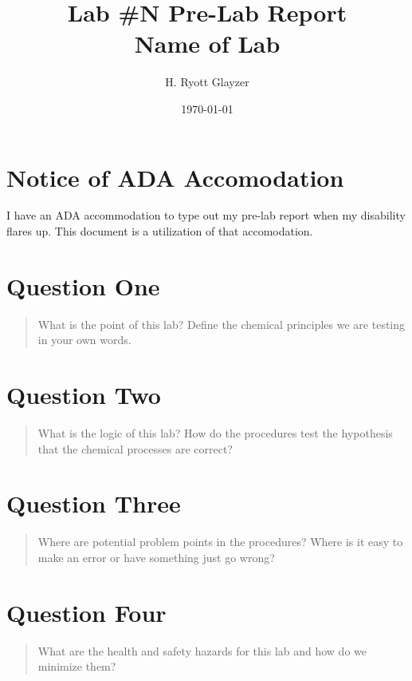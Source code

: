 \documentclass[11pt, letterpaper]{article}
\begin{document}


\title{Lab \#N Pre-Lab Report \\ \large Name of Lab}
\author{H. Ryott Glayzer}
\date{\today}


\maketitle


\section*{Notice of ADA Accomodation}
I have an ADA accommodation to type out my pre-lab report when my disability flares up.
This document is a utilization of that accomodation.

\section{Question One}
\begin{quote}
    What is the point of this lab? Define the chemical principles we are testing in your own words.
\end{quote}






\section{Question Two}
\begin{quote}
    What is the logic of this lab? How do the procedures test the hypothesis that the chemical 
    processes are correct?
\end{quote}






\section{Question Three}
\begin{quote}
    Where are potential problem points in the procedures? Where is it easy to make an error 
    or have something just go wrong?
\end{quote}






\section{Question Four}
\begin{quote}
    What are the health and safety hazards for this lab and how do we minimize them?
\end{quote}
\end{document}
